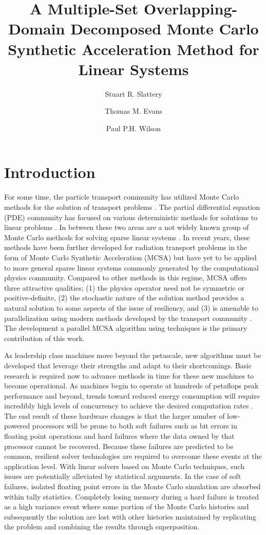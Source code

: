 \documentclass{snamc2013}
\title{A Multiple-Set Overlapping-Domain Decomposed Monte Carlo
  Synthetic Acceleration Method for Linear Systems}
\author[1]{Stuart R. Slattery}
\author[2]{Thomas M. Evans}
\author[1]{Paul P.H. Wilson}
\affil[1]{University of Wisconsin - Madison, Engineering Physics
  Department, 1500 Engineering Dr., Madison, WI 53706}
\affil[2]{Oak Ridge National Laboratory, Reactor and Nuclear Systems
  Division, 1 Bethel Valley Rd., Oak Ridge, TN 37831}
\begin{document}
\section{Introduction}

For some time, the particle transport community has utilized Monte
Carlo methods for the solution of transport problems
\cite{lewis_computational_1993}. The partial differential equation
(PDE) community has focused on various deterministic methods for
solutions to linear problems \cite{saad_iterative_2003,
  kelley_iterative_1995}. In between these two areas are a not widely
known group of Monte Carlo methods for solving sparse linear systems
\cite{forsythe_matrix_1950, hammersley_monte_1964,
  halton_sequential_1962, halton_sequential_1994}. In recent years,
these methods have been further developed for radiation transport
problems in the form of Monte Carlo Synthetic Acceleration (MCSA)
\cite{evans_monte_2009, evans_monte_2012} but have yet to be applied
to more general sparse linear systems commonly generated by the
computational physics community. Compared to other methods in this
regime, MCSA offers three attractive qualities; (1) the physics
operator need not be symmetric or positive-definite, (2) the
stochastic nature of the solution method provides a natural solution
to some aspects of the issue of resiliency, and (3) is amenable to
parallelization using modern methods developed by the transport
community \cite{wagner_hybrid_2010}. The development a parallel MCSA
algorithm using techniques is the primary contribution of this work.

As leadership class machines move beyond the petascale, new algorithms
must be developed that leverage their strengths and adapt to their
shortcomings. Basic research is required now to advance methods in
time for these new machines to become operational. As machines begin
to operate at hundreds of petaflops peak performance and beyond,
trends toward reduced energy consumption will require incredibly high
levels of concurrency to achieve the desired computation rates
\cite{kogge_using_2011}. The end result of these hardware changes is
that the larger number of low-powered processors will be prone to both
soft failures such as bit errors in floating point operations and hard
failures where the data owned by that processor cannot be
recovered. Because these failures are predicted to be common,
resilient solver technologies are required to overcome these events at
the application level. With linear solvers based on Monte Carlo
techniques, such issues are potentially alleviated by statistical
arguments. In the case of soft failures, isolated floating point
errors in the Monte Carlo simulation are absorbed within tally
statistics. Completely losing memory during a hard failure is treated
as a high variance event where some portion of the Monte Carlo
histories and subsequently the solution are lost with other histories
maintained by replicating the problem and combining the results
through superposition.
\end{document}
